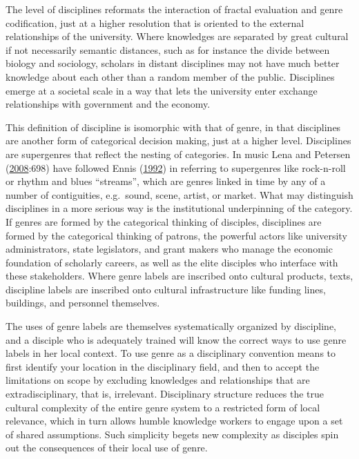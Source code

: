\documentclass[]{book}
\theoremstyle{definition}
\theoremstyle{definition}
\theoremstyle{definition}
\theoremstyle{remark}
\begin{document}
The level of disciplines reformats the interaction of fractal evaluation
and genre codification, just at a higher resolution that is oriented to
the external relationships of the university. Where knowledges are
separated by great cultural if not necessarily semantic distances, such
as for instance the divide between biology and sociology, scholars in
distant disciplines may not have much better knowledge about each other
than a random member of the public. Disciplines emerge at a societal
scale in a way that lets the university enter exchange relationships
with government and the economy.

This definition of discipline is isomorphic with that of genre, in that
disciplines are another form of categorical decision making, just at a
higher level. Disciplines are supergenres that reflect the nesting of
categories. In music Lena and Petersen
(\protect\hyperlink{ref-Lena2008Classification}{2008}:698) have followed
Ennis (\protect\hyperlink{ref-Ennis1992seventh}{1992}) in referring to
supergenres like rock-n-roll or rhythm and blues ``streams'', which are
genres linked in time by any of a number of contiguities, e.g.~sound,
scene, artist, or market. What may distinguish disciplines in a more
serious way is the institutional underpinning of the category. If genres
are formed by the categorical thinking of disciples, disciplines are
formed by the categorical thinking of patrons, the powerful actors like
university administrators, state legislators, and grant makers who
manage the economic foundation of scholarly careers, as well as the
elite disciples who interface with these stakeholders. Where genre
labels are inscribed onto cultural products, texts, discipline labels
are inscribed onto cultural infrastructure like funding lines,
buildings, and personnel themselves.

The uses of genre labels are themselves systematically organized by
discipline, and a disciple who is adequately trained will know the
correct ways to use genre labels in her local context. To use genre as a
disciplinary convention means to first identify your location in the
disciplinary field, and then to accept the limitations on scope by
excluding knowledges and relationships that are extradisciplinary, that
is, irrelevant. Disciplinary structure reduces the true cultural
complexity of the entire genre system to a restricted form of local
relevance, which in turn allows humble knowledge workers to engage upon
a set of shared assumptions. Such simplicity begets new complexity as
disciples spin out the consequences of their local use of genre.
\end{document}
